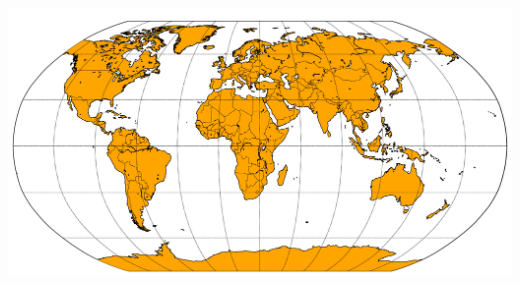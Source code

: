 \documentclass{beamer}
\begin{document}
\begin{frame}
    \includegraphics[width=1\textwidth]{static/part_2_map.pdf}
\end{frame}
\end{document}
